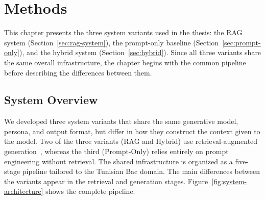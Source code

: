\chapter{Methods}
\label{chap:Methods}

This chapter presents the three system variants used in the thesis: the RAG
system (Section~\ref{sec:rag-system}), the prompt-only baseline
(Section~\ref{sec:prompt-only}), and the hybrid system
(Section~\ref{sec:hybrid}). Since all three variants share the same overall
infrastructure, the chapter begins with the common pipeline before describing
the differences between them.

\section{System Overview}
\label{sec:system-overview}

We developed three system variants that share the same generative model,
persona, and output format, but differ in how they construct the context
given to the model. Two of the three variants (RAG and Hybrid) use
retrieval-augmented generation~\cite{lewis2020rag,gao2024rag_survey},
whereas the third (Prompt-Only) relies entirely on prompt engineering
without retrieval. The shared infrastructure is organized as a five-stage
pipeline tailored to the Tunisian Bac domain. The main differences between
the variants appear in the retrieval and generation stages.
Figure~\ref{fig:system-architecture} shows the complete pipeline.

